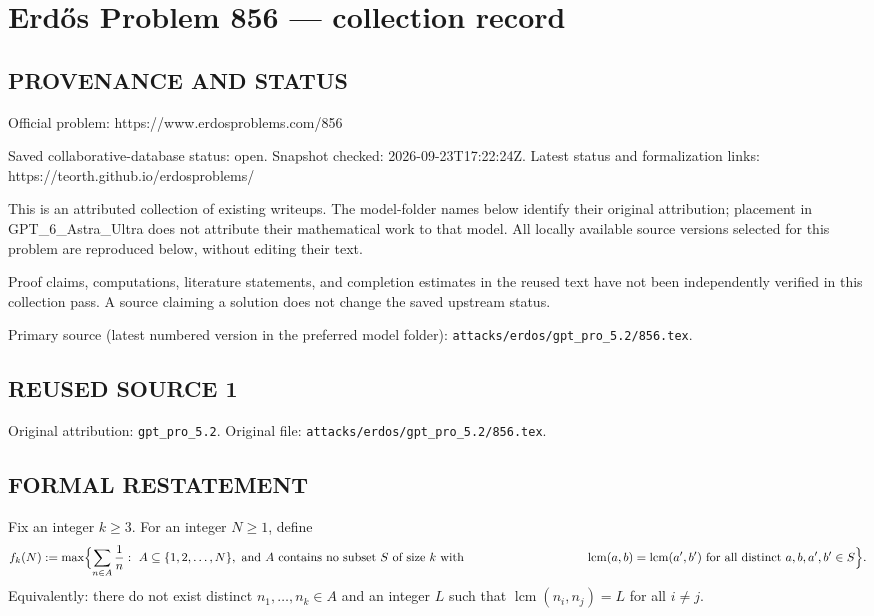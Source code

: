\section*{Erd\H{o}s Problem 856 --- collection record}

\subsection*{PROVENANCE AND STATUS}
Official problem: https://www.erdosproblems.com/856

Saved collaborative-database status: open.
Snapshot checked: 2026-09-23T17:22:24Z.
Latest status and formalization links: https://teorth.github.io/erdosproblems/

This is an attributed collection of existing writeups. The model-folder names below identify their original attribution; placement in GPT\_6\_Astra\_Ultra does not attribute their mathematical work to that model. All locally available source versions selected for this problem are reproduced below, without editing their text.

Proof claims, computations, literature statements, and completion estimates in the reused text have not been independently verified in this collection pass. A source claiming a solution does not change the saved upstream status.

Primary source (latest numbered version in the preferred model folder): \texttt{attacks/erdos/gpt\_pro\_5.2/856.tex}.

\subsection*{REUSED SOURCE 1}
Original attribution: \texttt{gpt\_pro\_5.2}.
Original file: \texttt{attacks/erdos/gpt\_pro\_5.2/856.tex}.


\subsection*{FORMAL RESTATEMENT}
Fix an integer $k\ge 3$.
For an integer $N\ge 1$, define
\[
  f_k(N):=\max\Bigl\{\sum_{n\in A}\frac{1}{n}:\ A\subseteq\{1,2,\dots,N\},\ \text{and $A$ contains no subset $S$ of size $k$ with}\ \\
  \qquad\qquad\qquad\qquad\qquad \operatorname{lcm}(a,b)=\operatorname{lcm}(a',b')\ \text{for all distinct }a,b,a',b'\in S\Bigr\}.
\]
Equivalently: there do not exist distinct $n_1,\dots,n_k\in A$ and an integer $L$ such that $\operatorname{lcm}(n_i,n_j)=L$ for all $i\ne j$.

